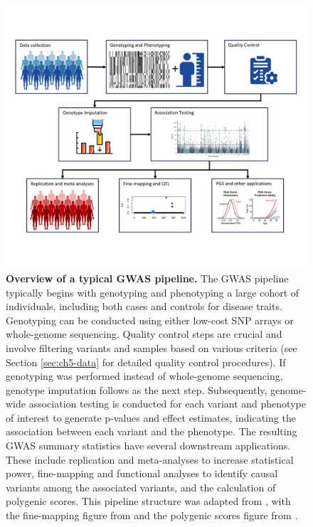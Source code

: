 \begin{figure}[h!]
    \centering
    \includegraphics[width=\textwidth]{figures/thesis_qd_gwas_pipeline.png}
    \caption{
    \textbf{Overview of a typical GWAS pipeline.} The GWAS pipeline typically begins with genotyping and phenotyping a large cohort of individuals, including both cases and controls for disease traits. Genotyping can be conducted using either low-cost SNP arrays or whole-genome sequencing. Quality control steps are crucial and involve filtering variants and samples based on various criteria (see Section \ref{sec:ch5-data} for detailed quality control procedures). If genotyping was performed instead of whole-genome sequencing, genotype imputation follows as the next step. Subsequently, genome-wide association testing is conducted for each variant and phenotype of interest to generate p-values and effect estimates, indicating the association between each variant and the phenotype. The resulting GWAS summary statistics have several downstream applications. These include replication and meta-analyses to increase statistical power, fine-mapping and functional analyses to identify causal variants among the associated variants, and the calculation of polygenic scores. This pipeline structure was adapted from \cite{uffelmann2021genome}, with the fine-mapping figure from \cite{Wang} and the polygenic scores figure from \cite{wand2021improving}.}
    \label{fig:qd-intro}
\end{figure}

